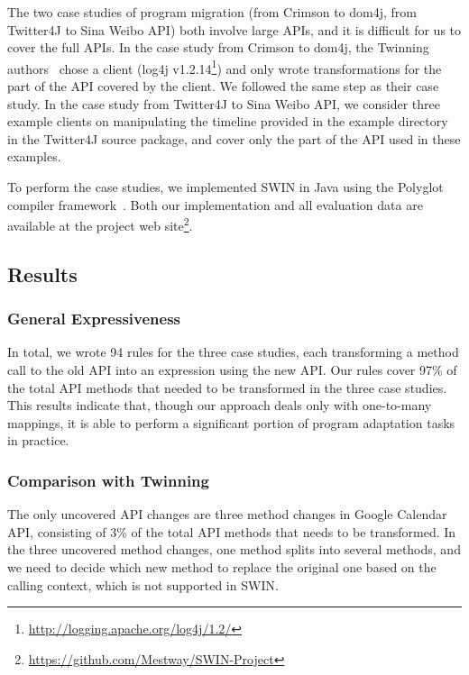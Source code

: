 The two case studies of program migration (from Crimson to dom4j, from
Twitter4J to Sina Weibo API) both involve large APIs, and it is
difficult for us to cover the full APIs. In the case study from
Crimson to dom4j, the Twinning authors~\cite{twinning} chose a client
(log4j v1.2.14\footnote{\url{http://logging.apache.org/log4j/1.2/}}) 
and only wrote transformations for the part of the API
covered by the client. We followed the same step as their case
study. In the case study from Twitter4J to Sina Weibo API, we consider
three example clients on manipulating the timeline provided in the example
directory in the Twitter4J source package, and cover only the part of
the API used in these examples.

To perform the case studies, we implemented SWIN in Java using
the Polyglot compiler framework~\cite{glot}. Both our
implementation and all evaluation data are available at the project
web site\footnote{\url{https://github.com/Mestway/SWIN-Project}}.

\subsection{Results}\label{sec:results}


\subsubsection{General Expressiveness}
In total, we wrote 94 rules for the three case studies, each
transforming a method call to the old API into an expression using the
new API. Our rules cover 97\% of the total API methods that needed to
be transformed in the three case studies. This results indicate that,
though our approach deals only with one-to-many mappings, it is able
to perform a significant portion of program adaptation tasks in
practice.

\subsubsection{Comparison with Twinning}
The only uncovered API changes are three method changes in
Google Calendar API, consisting of 3\% of the total API methods that
needs to be transformed. In the three uncovered method changes, one
method splits into several methods, and we need to decide which
new method to replace the original one based on the calling context,
which is not supported in SWIN.

